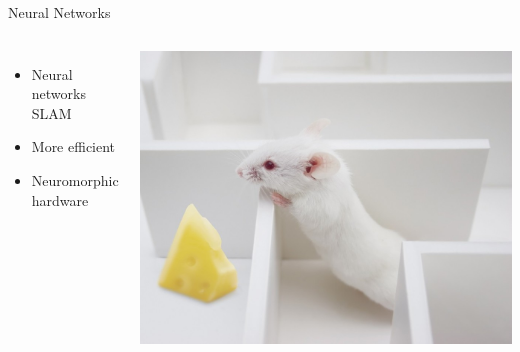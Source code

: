 \documentclass[17pt,mathserif]{beamer}
\begin{document}
    \begin{frame}{Neural Networks}{}
      \vspace*{-3em}        
      \begin{columns}
        \begin{itemize}
          \item Neural networks SLAM\cite{rat-slam}
          \item More efficient
          \item Neuromorphic hardware 
        \end{itemize}
        \hspace*{-1.em}
        \vspace*{-1em}
        \includegraphics[trim={0 0 12cm 0}, clip, width=\textwidth]{rat-maze-cheese}
      \end{columns}
    \end{frame}
\end{document}

